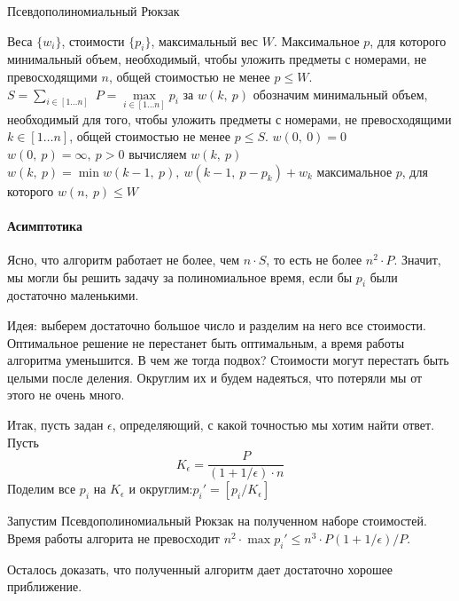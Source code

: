 \documentclass[a4paper,12pt]{article}
\begin{document}
\begin{algorithm}[H]
	\caption{Псевдополиномиальный Рюкзак}
	\label{algo:Knapsack}
	\begin{algorithmic}[1]
		\Require Веса $\{w_i\}$, стоимости $\{p_i\}$, максимальный вес $W$.
		\Ensure Максимальное $p$, для которого минимальный объем, необходимый, чтобы уложить предметы с номерами, не превосходящими $n$, общей стоимостью не менее $p \leqslant W$.
		\\
		\State $S = \sum\limits_{i \in [1\ldots n]}$
		\State $P = \max\limits_{i \in [1\ldots n]}p_i$
		\State за $w(k,\ p)$ обозначим минимальный объем, необходимый для того, чтобы уложить предметы с номерами, не превосходящими $k \in [1\ldots n]$, общей стоимостью не менее $p \leqslant S$.
		\State $w(0,\ 0) = 0$
		    \State $w(0,\ p) = \infty,\ p > 0$
		\EndFor
		        \State вычисляем $w(k,\ p)$
			    \State $w(k ,\ p) = \min{w(k - 1,\ p),\ w(k - 1,\ p - p_{k}) + w_{k}}$
			\EndFor
		\EndFor
		\State \Return максимальное $p$, для которого $w(n,\ p) \leqslant W$
	\end{algorithmic}
\end{algorithm}


\paragraph{Асимптотика}

Ясно, что алгоритм работает не более, чем $n\cdot S$, то есть не более $n^2\cdot P$. Значит, мы могли бы решить задачу за полиномиальное время,
если бы $p_i$ были достаточно маленькими.

Идея: выберем достаточно большое число и разделим на него все стоимости. Оптимальное решение не перестанет быть оптимальным, а время работы алгоритма уменьшится. В чем же тогда подвох? Стоимости могут перестать быть целыми после деления. Округлим их и будем надеяться, что потеряли мы от этого не
очень много.

Итак, пусть задан $\epsilon$, определяющий, с какой точностью мы хотим
найти ответ. Пусть\[K_\epsilon = \frac{P}{(1 + 1\slash\epsilon)\cdot n}\]
Поделим все $p_i$ на $K_\epsilon$ и округлим:$p_i'= [p_i\slash K_\epsilon]$

Запустим Псевдополиномиальный Рюкзак на полученном наборе стоимостей. Время работы алгорита не превосходит $n^2\cdot\max p_i' \leqslant n^3\cdot P(1 + 1\slash\epsilon)\slash P$.

Осталось доказать, что полученный алгоритм дает достаточно
хорошее приближение.
\end{document}
